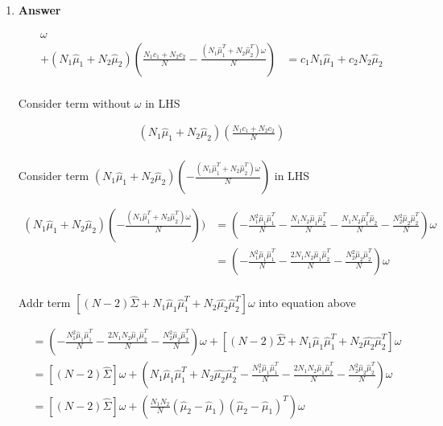\documentclass[11pt]{article}
\begin{document}
\begin{enumerate}[label=(\alph*)]
\begin{enumerate}[label=(\roman*)]
\item  \textbf{Answer}

\begin{align*}
[(N-2)\hat{\Sigma}+N_1\hat{\mu}_1\hat{\mu}_1^T+N_2\hat{ \mu_2}\hat{\mu}_2^T]\omega \\
+(N_1\hat{\mu}_1+N_2\hat{\mu}_2)
(\frac{N_1c_1+N_2c_2}{N} 
-\frac{(N_1\hat{\mu}_1^T+N_2\hat{\mu}_2^T)\omega}{N} )
&= c_1N_1\hat{\mu}_1 +c_2N_2\hat{\mu}_2 \\
\end{align*}

Consider term without $\omega$ in LHS

\begin{align*}
(N_1\hat{\mu}_1+N_2\hat{\mu}_2)
(\frac{N_1c_1+N_2c_2}{N})  \\
\end{align*}

Consider term $(N_1\hat{\mu}_1+N_2\hat{\mu}_2)(-\frac{(N_1\hat{\mu}_1^T+N_2\hat{\mu}_2^T)\omega}{N})$ in LHS


\begin{align*}
(N_1\hat{\mu}_1+N_2\hat{\mu}_2)(-\frac{(N_1\hat{\mu}_1^T+N_2\hat{\mu}_2^T)\omega}{N})) &=
(-\frac{N_1^2\hat{\mu}_1\hat{\mu}_1^T}{N}
-\frac{N_1N_2\hat{\mu}_1\hat{\mu}_2^T}{N}
-\frac{N_1N_2\hat{\mu}_1^T\hat{\mu}_2}{N}
-\frac{N_2^2\hat{\mu}_2\hat{\mu}_2^T}{N})\omega  \\
&=
(-\frac{N_1^2\hat{\mu}_1\hat{\mu}_1^T}{N}
-\frac{2N_1N_2\hat{\mu}_1\hat{\mu}_2^T}{N}
-\frac{N_2^2\hat{\mu}_2\hat{\mu}_2^T}{N})\omega  \\
\end{align*}

Addr term $[(N-2)\hat{\Sigma}+N_1\hat{\mu}_1\hat{\mu}_1^T+N_2\hat{ \mu_2}\hat{\mu}_2^T]\omega$ into equation above

\begin{align*}
&=
(-\frac{N_1^2\hat{\mu}_1\hat{\mu}_1^T}{N}
-\frac{2N_1N_2\hat{\mu}_1\hat{\mu}_2^T}{N}
-\frac{N_2^2\hat{\mu}_2\hat{\mu}_2^T}{N})\omega
+  [(N-2)\hat{\Sigma}+N_1\hat{\mu}_1\hat{\mu}_1^T+N_2\hat{ \mu_2}\hat{\mu}_2^T]\omega\\
&= [(N-2)\hat{\Sigma}]\omega
+ (N_1\hat{\mu}_1\hat{\mu}_1^T
+N_2\hat{ \mu_2}\hat{\mu}_2^T
-\frac{N_1^2\hat{\mu}_1\hat{\mu}_1^T}{N}
-\frac{2N_1N_2\hat{\mu}_1\hat{\mu}_2^T}{N}
-\frac{N_2^2\hat{\mu}_2\hat{\mu}_2^T}{N}
)\omega\\
&= [(N-2)\hat{\Sigma}]\omega
+ (\frac{N_1N_2}{N}(\hat{\mu}_2-\hat{\mu}_1)(\hat{\mu}_2-\hat{\mu}_1)^T
)\omega\\
\end{align*}


\end{enumerate}
\end{enumerate}
\end{document}
